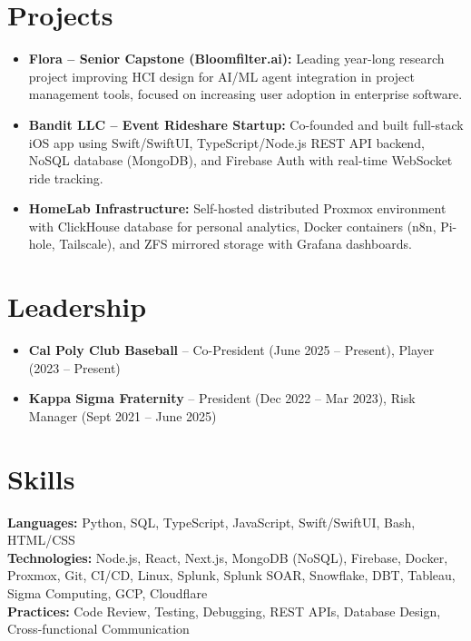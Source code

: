 \documentclass[letterpaper,11pt]{article}
\begin{document}
\section{Projects}
\begin{itemize}[leftmargin=0.15in, label=\textbullet, itemsep=0pt, parsep=0pt]
  \item \small{\textbf{Flora -- Senior Capstone (Bloomfilter.ai):} Leading year-long research project improving HCI design for AI/ML agent integration in project management tools, focused on increasing user adoption in enterprise software.}
  \item \small{\textbf{Bandit LLC -- Event Rideshare Startup:} Co-founded and built full-stack iOS app using Swift/SwiftUI, TypeScript/Node.js REST API backend, NoSQL database (MongoDB), and Firebase Auth with real-time WebSocket ride tracking.}
  \item \small{\textbf{HomeLab Infrastructure:} Self-hosted distributed Proxmox environment with ClickHouse database for personal analytics, Docker containers (n8n, Pi-hole, Tailscale), and ZFS mirrored storage with Grafana dashboards.}
\end{itemize}

\section{Leadership}
\begin{itemize}[leftmargin=0.15in, label=\textbullet, itemsep=0pt, parsep=0pt]
  \item \small{\textbf{Cal Poly Club Baseball} -- Co-President (June 2025 -- Present), Player (2023 -- Present)}
  \item \small{\textbf{Kappa Sigma Fraternity} -- President (Dec 2022 -- Mar 2023), Risk Manager (Sept 2021 -- June 2025)}
\end{itemize}

\section{Skills}
{\small
\textbf{Languages:} Python, SQL, TypeScript, JavaScript, Swift/SwiftUI, Bash, HTML/CSS \\
\textbf{Technologies:} Node.js, React, Next.js, MongoDB (NoSQL), Firebase, Docker, Proxmox, Git, CI/CD, Linux, Splunk, Splunk SOAR, Snowflake, DBT, Tableau, Sigma Computing, GCP, Cloudflare \\
\textbf{Practices:} Code Review, Testing, Debugging, REST APIs, Database Design, Cross-functional Communication
}

\end{document}
